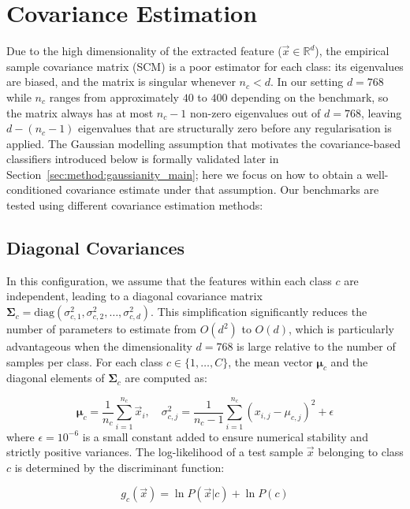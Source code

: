\section{Covariance Estimation}
\label{sec:covariance_estimation}

Due to the high dimensionality of the extracted feature ($\vec{x}\in \mathbb{R}^d$), the empirical sample covariance matrix (SCM) is a poor estimator for each class: its eigenvalues are biased, and the matrix is singular whenever $n_c < d$. In our setting $d = 768$ while $n_c$ ranges from approximately $40$ to $400$ depending on the benchmark, so the matrix always has at most $n_c - 1$ non-zero eigenvalues out of $d = 768$, leaving $d - (n_c - 1)$ eigenvalues that are structurally zero before any regularisation is applied.
The Gaussian modelling assumption that motivates the covariance-based classifiers introduced below is formally validated later in Section~\ref{sec:method:gaussianity_main}; here we focus on how to obtain a well-conditioned covariance estimate under that assumption. Our benchmarks are tested using different covariance estimation methods:

\subsection{Diagonal Covariances}
In this configuration, we assume that the features within each class $c$ are independent, leading to a diagonal covariance matrix $\boldsymbol{\Sigma}_c = \text{diag}(\sigma_{c,1}^2, \sigma_{c,2}^2, \dots, \sigma_{c,d}^2)$. This simplification significantly reduces the number of parameters to estimate from $O(d^2)$ to $O(d)$, which is particularly advantageous when the dimensionality $d = 768$ is large relative to the number of samples per class. For each class $c \in \{1, \dots, C\}$, the mean vector $\boldsymbol{\mu}_c$ and the diagonal elements of $\boldsymbol{\Sigma}_c$ are computed as:

\begin{equation}
	\boldsymbol{\mu}_c = \frac{1}{n_c} \sum_{i=1}^{n_c} \vec{x}_i, \quad \sigma_{c,j}^2 = \frac{1}{n_c-1} \sum_{i=1}^{n_c} (x_{i,j} - \mu_{c,j})^2 + \epsilon
\end{equation}
where $\epsilon = 10^{-6}$ is a small constant added to ensure numerical stability and strictly positive variances. The log-likelihood of a test sample $\vec{x}$ belonging to class $c$ is determined by the discriminant function:

\begin{equation}
	g_c(\vec{x}) = \ln P(\vec{x}|c) + \ln P(c)
\end{equation}

